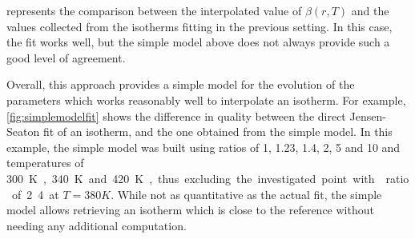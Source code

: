 \documentclass[main.tex]{subfiles}
\begin{document}
 represents the comparison between the interpolated value of $\beta(r, T)$ and the values collected from the isotherms fitting in the previous setting. In this case, the fit works well, but the simple model above does not always provide such a good level of agreement.

Overall, this approach provides a simple model for the evolution of the parameters which works reasonably well to interpolate an isotherm. For example, \cref{fig:simplemodelfit} shows the difference in quality between the direct Jensen-Seaton fit of an isotherm, and the one obtained from the simple model. In this example, the simple model was built using \SiAl ratios of 1, 1.23, 1.4, 2, 5 and 10 and temperatures of \qty{300}K, \qty{340}K and \qty{420}K, thus excluding the investigated point with \SiAl ratio of 2.4 at $T = \qty{380}K$. While not as quantitative as the actual fit, the simple model allows retrieving an isotherm which is close to the reference without needing any additional computation.
\end{document}
